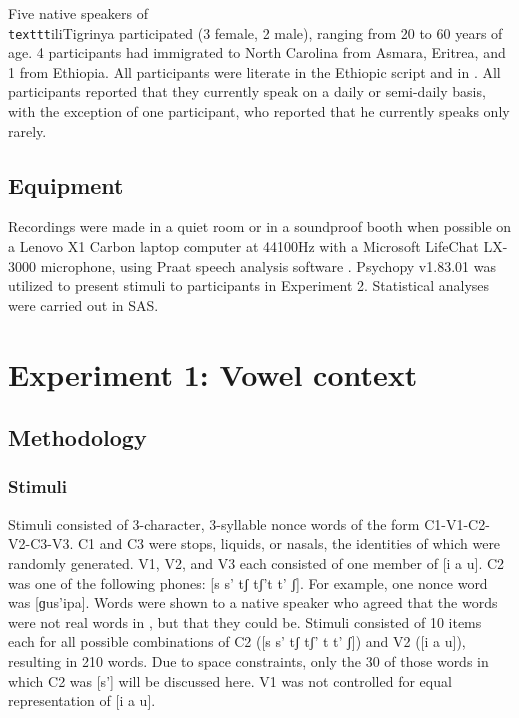 \documentclass[output=paper,newtxmath,modfonts,nonflat,final]{langsci/langscibook}
\begin{document}
Five native speakers of \texttt{\\texttt{}}ili{Tigrinya} participated (3 female, 2 male), ranging from 20 to 60 years of age. 4 participants had immigrated to North Carolina from Asmara, Eritrea, and 1 from Ethiopia. All participants were literate in the Ethiopic script and in . All participants reported that they currently speak  on a daily or semi-daily basis, with the exception of one participant, who reported that he currently speaks  only rarely.

\subsection{Equipment}\label{sec:moeng:4.2}

Recordings were made in a quiet room or in a soundproof booth when possible on a Lenovo X1 Carbon laptop computer at 44100Hz with a Microsoft LifeChat LX-3000 microphone, using Praat speech analysis software \citep{boersma2013praat}. Psychopy v1.83.01 \citep{peirce2007psychopy} was utilized to present stimuli to participants in Experiment 2. Statistical analyses were carried out in SAS.

\section{Experiment 1: Vowel context}\label{sec:moeng:5}

\subsection{Methodology}\label{sec:moeng:5.1}
\subsubsection{Stimuli}\label{sec:moeng:5.1.1}

Stimuli consisted of 3-character, 3-syllable nonce words of the form C1-V1-C2-V2-C3-V3. C1 and C3 were stops, liquids, or nasals, the identities of which were randomly generated. V1, V2, and V3 each consisted of one member of [i a u]. C2 was one of the following phones: [s s’ tʃ tʃ’t t’ ʃ]. For example, one nonce word was  [ɡus’ipa]. Words were shown to a native speaker who agreed that the words were not real words in , but that they could be. Stimuli consisted of 10 items each for all possible combinations of C2 ([s s’ tʃ tʃ’ t t’ ʃ]) and V2 ([i a u]), resulting in 210 words. Due to space constraints, only the 30 of those words in which C2 was [s’] will be discussed here. V1 was not controlled for equal representation of [i a u].
\end{document}
